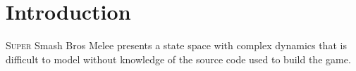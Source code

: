 
\section{Introduction}
\lettrine{S}{uper} Smash Bros Melee presents a state space with complex dynamics that is difficult to model without knowledge of the source code used to build the game. 